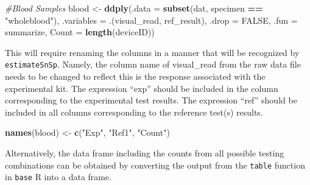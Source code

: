 \documentclass[
  12pt,
]{article}
\newenvironment{Shaded}{\begin{snugshade}}{\end{snugshade}}
\newcommand{\AttributeTok}[1]{\textcolor[rgb]{0.13,0.29,0.53}{#1}}
\newcommand{\CommentTok}[1]{\textcolor[rgb]{0.56,0.35,0.01}{\textit{#1}}}
\newcommand{\ConstantTok}[1]{\textcolor[rgb]{0.56,0.35,0.01}{#1}}
\newcommand{\FunctionTok}[1]{\textcolor[rgb]{0.13,0.29,0.53}{\textbf{#1}}}
\newcommand{\NormalTok}[1]{#1}
\newcommand{\OtherTok}[1]{\textcolor[rgb]{0.56,0.35,0.01}{#1}}
\newcommand{\SpecialCharTok}[1]{\textcolor[rgb]{0.81,0.36,0.00}{\textbf{#1}}}
\newcommand{\StringTok}[1]{\textcolor[rgb]{0.31,0.60,0.02}{#1}}
\begin{document}
\begin{Shaded}
\begin{Highlighting}[]
\CommentTok{\#Blood Samples}
\NormalTok{blood }\OtherTok{\textless{}{-}} \FunctionTok{ddply}\NormalTok{(}\AttributeTok{.data =} \FunctionTok{subset}\NormalTok{(dat, specimen }\SpecialCharTok{==} \StringTok{"wholeblood"}\NormalTok{),}
                  \AttributeTok{.variables =}\NormalTok{ .(visual\_read, ref\_result),}
                  \AttributeTok{.drop =} \ConstantTok{FALSE}\NormalTok{,}
                  \AttributeTok{.fun =}\NormalTok{ summarize,}
                  \AttributeTok{Count =} \FunctionTok{length}\NormalTok{(deviceID))}
\end{Highlighting}
\end{Shaded}

This will require renaming the columns in a manner that will be
recognized by \texttt{estimateSnSp}. Namely, the column name of
visual\_read from the raw data file needs to be changed to reflect this
is the response associated with the experimental kit. The expression
``exp'' should be included in the column corresponding to the
experimental test results. The expression ``ref'' should be included in
all columns corresponding to the reference test(s) results.

\begin{Shaded}
\begin{Highlighting}[]
\FunctionTok{names}\NormalTok{(blood) }\OtherTok{\textless{}{-}} \FunctionTok{c}\NormalTok{(}\StringTok{"Exp"}\NormalTok{, }\StringTok{"Ref1"}\NormalTok{, }\StringTok{"Count"}\NormalTok{)}
\end{Highlighting}
\end{Shaded}

Alternatively, the data frame including the counts from all possible
testing combinations can be obtained by converting the output from the
\texttt{table} function in \texttt{base} R into a data frame.

\begin{Shaded}
\end{Shaded}
\end{document}
